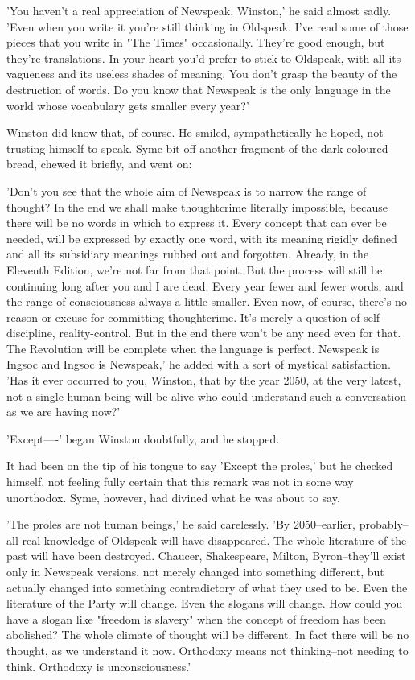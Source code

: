 \documentclass{article}
\begin{document}
'You haven't a real appreciation of Newspeak, Winston,' he said almost
sadly. 'Even when you write it you're still thinking in Oldspeak. I've read
some of those pieces that you write in "The Times" occasionally. They're
good enough, but they're translations. In your heart you'd prefer to stick
to Oldspeak, with all its vagueness and its useless shades of meaning.
You don't grasp the beauty of the destruction of words. Do you know that
Newspeak is the only language in the world whose vocabulary gets smaller
every year?'

Winston did know that, of course. He smiled, sympathetically he hoped, not
trusting himself to speak. Syme bit off another fragment of the
dark-coloured bread, chewed it briefly, and went on:

'Don't you see that the whole aim of Newspeak is to narrow the range of
thought? In the end we shall make thoughtcrime literally impossible,
because there will be no words in which to express it. Every concept that
can ever be needed, will be expressed by exactly one word, with its meaning
rigidly defined and all its subsidiary meanings rubbed out and forgotten.
Already, in the Eleventh Edition, we're not far from that point. But the
process will still be continuing long after you and I are dead. Every year
fewer and fewer words, and the range of consciousness always a little
smaller. Even now, of course, there's no reason or excuse for committing
thoughtcrime. It's merely a question of self-discipline, reality-control.
But in the end there won't be any need even for that. The Revolution will
be complete when the language is perfect. Newspeak is Ingsoc and Ingsoc
is Newspeak,' he added with a sort of mystical satisfaction. 'Has it ever
occurred to you, Winston, that by the year 2050, at the very latest, not a
single human being will be alive who could understand such a conversation
as we are having now?'

'Except----' began Winston doubtfully, and he stopped.

It had been on the tip of his tongue to say 'Except the proles,' but he
checked himself, not feeling fully certain that this remark was not in
some way unorthodox. Syme, however, had divined what he was about to say.

'The proles are not human beings,' he said carelessly. 'By 2050--earlier,
probably--all real knowledge of Oldspeak will have disappeared. The whole
literature of the past will have been destroyed. Chaucer, Shakespeare,
Milton, Byron--they'll exist only in Newspeak versions, not merely changed
into something different, but actually changed into something contradictory
of what they used to be. Even the literature of the Party will change.
Even the slogans will change. How could you have a slogan like "freedom is
slavery" when the concept of freedom has been abolished? The whole climate
of thought will be different. In fact there will be no thought, as we
understand it now. Orthodoxy means not thinking--not needing to think.
Orthodoxy is unconsciousness.'
\end{document}
